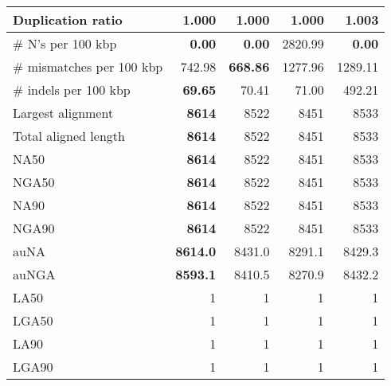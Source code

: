 \documentclass[12pt,a4paper]{article}
\begin{document}
\begin{table}[ht]
\begin{center}
\begin{tabular}{|l*{4}{|r}|}
Duplication ratio & {\bf 1.000} & {\bf 1.000} & {\bf 1.000} & 1.003 \\ \hline
\# N's per 100 kbp & {\bf 0.00} & {\bf 0.00} & 2820.99 & {\bf 0.00} \\ \hline
\# mismatches per 100 kbp & 742.98 & {\bf 668.86} & 1277.96 & 1289.11 \\ \hline
\# indels per 100 kbp & {\bf 69.65} & 70.41 & 71.00 & 492.21 \\ \hline
Largest alignment & {\bf 8614} & 8522 & 8451 & 8533 \\ \hline
Total aligned length & {\bf 8614} & 8522 & 8451 & 8533 \\ \hline
NA50 & {\bf 8614} & 8522 & 8451 & 8533 \\ \hline
NGA50 & {\bf 8614} & 8522 & 8451 & 8533 \\ \hline
NA90 & {\bf 8614} & 8522 & 8451 & 8533 \\ \hline
NGA90 & {\bf 8614} & 8522 & 8451 & 8533 \\ \hline
auNA & {\bf 8614.0} & 8431.0 & 8291.1 & 8429.3 \\ \hline
auNGA & {\bf 8593.1} & 8410.5 & 8270.9 & 8432.2 \\ \hline
LA50 & 1 & 1 & 1 & 1 \\ \hline
LGA50 & 1 & 1 & 1 & 1 \\ \hline
LA90 & 1 & 1 & 1 & 1 \\ \hline
LGA90 & 1 & 1 & 1 & 1 \\ \hline
\end{tabular}
\end{center}
\end{table}
\end{document}
